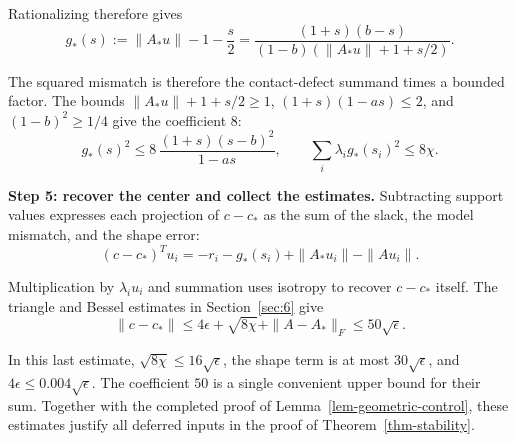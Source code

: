 Rationalizing therefore gives
\begin{equation}\label{eq:9.20}
g_*(s):=\|A_*u\|-1-\frac s2
=\frac{(1+s)(b-s)}{(1-b)(\|A_*u\|+1+s/2)}.
\end{equation}

The squared mismatch is therefore the contact-defect summand times a bounded
factor. The bounds $\|A_*u\|+1+s/2\ge1$, $(1+s)(1-as)\le2$, and
$(1-b)^2\ge1/4$ give the coefficient $8$:
\begin{equation}\label{eq:9.21}
g_*(s)^2
\le8\,\frac{(1+s)(s-b)^2}{1-as},
\qquad
\sum_i\lambda_i g_*(s_i)^2\le8\chi.
\end{equation}

\textbf{Step 5: recover the center and collect the estimates.} Subtracting support
values expresses each projection of $c-c_*$ as the sum of the slack, the
model mismatch, and the shape error:
\begin{equation}\label{eq:9.22}
(c-c_*)^Tu_i=-r_i-g_*(s_i)+\|A_*u_i\|-\|Au_i\|.
\end{equation}

Multiplication by $\lambda_i u_i$ and summation uses isotropy to recover
$c-c_*$ itself. The triangle and Bessel estimates in Section~\ref{sec:6} give
\begin{equation}\label{eq:9.23}
\|c-c_*\|\le4\epsilon+\sqrt{8\chi}+\|A-A_*\|_F
\le50\sqrt\epsilon.
\end{equation}

In this last estimate, $\sqrt{8\chi}\le16\sqrt\epsilon$, the shape term is
at most $30\sqrt\epsilon$, and $4\epsilon\le0.004\sqrt\epsilon$.
The coefficient $50$ is a single convenient upper bound for their sum.
Together with the completed proof of Lemma~\ref{lem-geometric-control}, these estimates justify
all deferred inputs in the proof of Theorem~\ref{thm-stability}.
